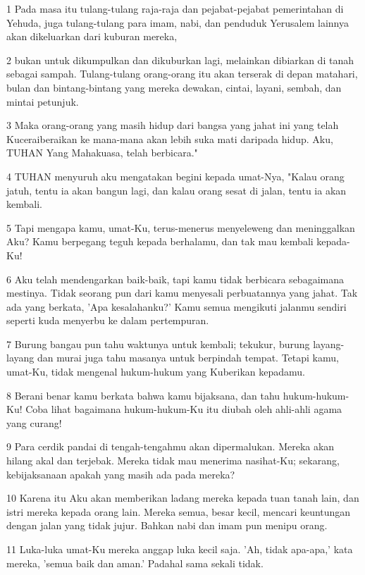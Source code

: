 \par 1 Pada masa itu tulang-tulang raja-raja dan pejabat-pejabat pemerintahan di Yehuda, juga tulang-tulang para imam, nabi, dan penduduk Yerusalem lainnya akan dikeluarkan dari kuburan mereka,
\par 2 bukan untuk dikumpulkan dan dikuburkan lagi, melainkan dibiarkan di tanah sebagai sampah. Tulang-tulang orang-orang itu akan terserak di depan matahari, bulan dan bintang-bintang yang mereka dewakan, cintai, layani, sembah, dan mintai petunjuk.
\par 3 Maka orang-orang yang masih hidup dari bangsa yang jahat ini yang telah Kuceraiberaikan ke mana-mana akan lebih suka mati daripada hidup. Aku, TUHAN Yang Mahakuasa, telah berbicara."
\par 4 TUHAN menyuruh aku mengatakan begini kepada umat-Nya, "Kalau orang jatuh, tentu ia akan bangun lagi, dan kalau orang sesat di jalan, tentu ia akan kembali.
\par 5 Tapi mengapa kamu, umat-Ku, terus-menerus menyeleweng dan meninggalkan Aku? Kamu berpegang teguh kepada berhalamu, dan tak mau kembali kepada-Ku!
\par 6 Aku telah mendengarkan baik-baik, tapi kamu tidak berbicara sebagaimana mestinya. Tidak seorang pun dari kamu menyesali perbuatannya yang jahat. Tak ada yang berkata, 'Apa kesalahanku?' Kamu semua mengikuti jalanmu sendiri seperti kuda menyerbu ke dalam pertempuran.
\par 7 Burung bangau pun tahu waktunya untuk kembali; tekukur, burung layang-layang dan murai juga tahu masanya untuk berpindah tempat. Tetapi kamu, umat-Ku, tidak mengenal hukum-hukum yang Kuberikan kepadamu.
\par 8 Berani benar kamu berkata bahwa kamu bijaksana, dan tahu hukum-hukum-Ku! Coba lihat bagaimana hukum-hukum-Ku itu diubah oleh ahli-ahli agama yang curang!
\par 9 Para cerdik pandai di tengah-tengahmu akan dipermalukan. Mereka akan hilang akal dan terjebak. Mereka tidak mau menerima nasihat-Ku; sekarang, kebijaksanaan apakah yang masih ada pada mereka?
\par 10 Karena itu Aku akan memberikan ladang mereka kepada tuan tanah lain, dan istri mereka kepada orang lain. Mereka semua, besar kecil, mencari keuntungan dengan jalan yang tidak jujur. Bahkan nabi dan imam pun menipu orang.
\par 11 Luka-luka umat-Ku mereka anggap luka kecil saja. 'Ah, tidak apa-apa,' kata mereka, 'semua baik dan aman.' Padahal sama sekali tidak.
